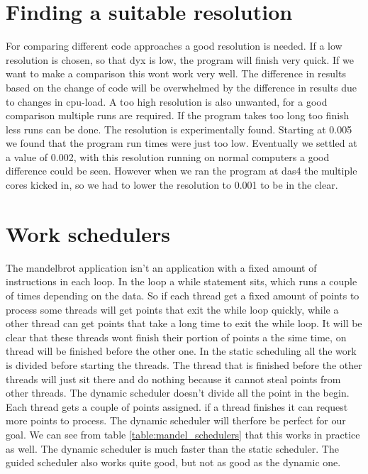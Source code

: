 \documentclass[a4paper]{article}
\begin{document}
\section{Finding a suitable resolution}
	For comparing different code approaches a good resolution is needed.
	If a low resolution is chosen, so that dyx is low, the program will finish very quick.
	If we want to make a comparison this wont work very well.
	The difference in results based on the change of code will be overwhelmed by the difference in results due to changes in cpu-load.
	A too high resolution is also unwanted, for a good comparison multiple runs are required.
	If the program takes too long too finish less runs can be done.
	The resolution is experimentally found.
	Starting at 0.005 we found that the program run times were just too low.
	Eventually we settled at a value of 0.002, with this resolution running on normal computers a good difference could be seen.
	However when we ran the program at das4 the multiple cores kicked in, so we had to lower the resolution to 0.001 to be in the clear.
	

\section{Work schedulers}
	The mandelbrot application isn't an application with a fixed amount of instructions in each loop.
	In the loop a while statement sits, which runs a couple of times depending on the data.
	So if each thread get a fixed amount of points to process some threads will get points that exit the while loop quickly, while a other thread can get points that take a long time to exit the while loop.
	It will be clear that these threads wont finish their portion of points a the sime time, on thread will be finished before the other one.
	In the static scheduling all the work is divided before starting the threads.
	The thread that is finished before the other threads will just sit there and do nothing because it cannot steal points from other threads.
	The dynamic scheduler doesn't divide all the point in the begin. Each thread gets a couple of points assigned.
	if a thread finishes it can request more points to process. The dynamic scheduler will therfore be perfect for our goal.
	We can see from table \ref{table:mandel_schedulers} that this works in practice as well.
	The dynamic scheduler is much faster than the static scheduler.
	The guided scheduler also works quite good, but not as good as the dynamic one.
	
\end{document}

